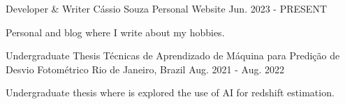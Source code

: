 

\begin{cventries}

  \cventry
    {Developer \& Writer} %
    {Cássio Souza} %
    {Personal Website} %
    {Jun. 2023 - PRESENT} %
    {
      \begin{cvitems} %
        \item {Personal and blog where I write about my hobbies.}
      \end{cvitems}
    }

  \cventry
    {Undergraduate Thesis} %
    {Técnicas de Aprendizado de Máquina para Predição de Desvio Fotométrico} %
    {Rio de Janeiro, Brazil} %
    {Aug. 2021 - Aug. 2022} %
    {
      \begin{cvitems} %
        \item {Undergraduate thesis where is explored the use of AI for redshift estimation.}
      \end{cvitems}
    }

\end{cventries}
